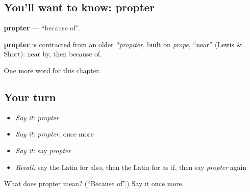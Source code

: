 \subsection*{You'll want to know: propter}
\textbf{propter} — \textquotedblleft{}because of\textquotedblright{}.

\begin{cousinweb}
\textbf{propter} is contracted from an older \emph{*propiter}, built on \emph{prope}, \textquotedblleft{}near\textquotedblright{} (Lewis \& Short): near by, then because of.
\end{cousinweb}

\begin{grammarlens}[title={What you've built}]
One more word for this chapter.
\end{grammarlens}

\subsection*{Your turn}
\begin{itemize}
\raggedright
  \item \emph{Say it:} \emph{propter}
  \item \emph{Say it:} \emph{propter}, once more
  \item \emph{Say it:} say \emph{propter}
  \item \emph{Recall:} say the Latin for also, then the Latin for as if, then say \emph{propter} again
\end{itemize}

\begin{tcolorbox}[breakable,colback=teal!4,colframe=teal!35!black,title={Before you move on}]
What does propter mean? (\textquotedblleft{}Because of\textquotedblright{}.) Say it once more.
\end{tcolorbox}
